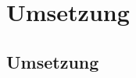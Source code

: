 
\chapter{Umsetzung}  %
\label{cha:} %
\section{Umsetzung} %
\label{sec:} %


\subsection{} %
\label{sse:}
\subsubsection{} %
\label{sss:}
